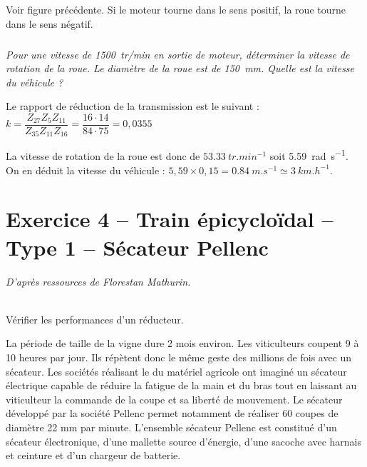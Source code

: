 \documentclass[10pt,fleqn]{article} %
\begin{document}
\begin{multicols}{2}
\begin{multicols}{2}
\ifprof
\begin{corrige}
Voir figure précédente. Si le moteur tourne dans le sens positif, la roue tourne dans le sens négatif. 
\end{corrige}
\else
\fi

\subparagraph{}
\textit{Pour une vitesse de \SI{1500}{tr/min} en sortie de moteur, déterminer la vitesse de rotation de la roue. Le diamètre de la roue est de \SI{150}{mm}. Quelle est la vitesse du véhicule ? }
\ifprof
\begin{corrige}
Le rapport de réduction de la transmission est le suivant : 
$k=\dfrac{Z_{27} Z_{5} Z_{11} }{Z_{35} Z_{11} Z_{16}} = \dfrac{16\cdot 14}{84\cdot 75} =0,0355 $

La vitesse de rotation de la roue est donc de $\SI{53,33}{tr.min^{-1}}$ soit \SI{5,59}{rad.s^{-1}}. 
On en déduit la vitesse du véhicule : $5,59 \times 0,15 = \SI{0,84}{m.s^{-1}}\simeq \SI{3}{km.h^{-1}}$.

\end{corrige}
\else
\fi

\section*{Exercice 4 -- Train épicycloïdal -- Type 1 -- Sécateur Pellenc}
\setcounter{exo}{0}
\textit{D'après ressources de Florestan Mathurin.}

\ifprof
\else

\begin{obj}~\\
Vérifier les performances d'un réducteur.
\end{obj}


La période de taille de la vigne dure 2 mois environ. Les viticulteurs coupent 9 à 10 heures par jour. Ils répètent donc le même geste des millions de fois avec un sécateur. Les sociétés réalisant le du matériel agricole ont imaginé un sécateur électrique capable de réduire la fatigue de la main et du bras tout en laissant au viticulteur la commande de la coupe et sa liberté de mouvement. Le sécateur développé par la société Pellenc permet notamment de réaliser 60 coupes de diamètre 22 mm par minute. L’ensemble sécateur Pellenc est constitué d’un sécateur électronique, d’une mallette source d’énergie, d’une sacoche avec harnais et ceinture et d’un chargeur de batterie.

%



\end{multicols}
\end{multicols}
\end{document}
